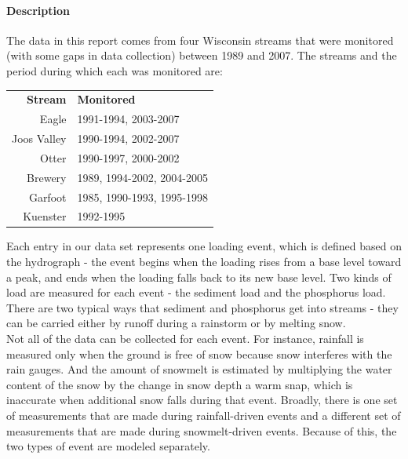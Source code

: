 \documentclass[12pt]{article}
\begin{document}
\paragraph{Description}
The data in this report comes from four Wisconsin streams that were monitored (with some gaps in data collection) between 1989 and 2007. The streams and the period during which each was monitored are:

\begin{table}[h]
\begin{center}
\begin{tabular}{r l}
        \textbf{Stream} & \textbf{Monitored} \\
        Eagle & 1991-1994, 2003-2007\\
        Joos Valley & 1990-1994, 2002-2007\\
        Otter & 1990-1997, 2000-2002\\
        Brewery & 1989, 1994-2002, 2004-2005\\
        Garfoot & 1985, 1990-1993, 1995-1998\\
        Kuenster & 1992-1995\\
    \end{tabular}
\end{center}
\end{table}

Each entry in our data set represents one loading event, which is defined based on the hydrograph - the event begins when the loading rises from a base level toward a peak, and ends when the loading falls back to its new base level. Two kinds of load are measured for each event - the sediment load and the phosphorus load. There are two typical ways that sediment and phosphorus get into streams - they can be carried either by runoff during a rainstorm or by melting snow.\\

Not all of the data can be collected for each event. For instance, rainfall is measured only when the ground is free of snow because snow interferes with the rain gauges. And the amount of snowmelt is estimated by multiplying the water content of the snow by the change in snow depth a warm snap, which is inaccurate when additional snow falls during that event. Broadly, there is one set of measurements that are made during rainfall-driven events and a different set of measurements that are made during snowmelt-driven events. Because of this, the two types of event are modeled separately.\\
\end{document}
